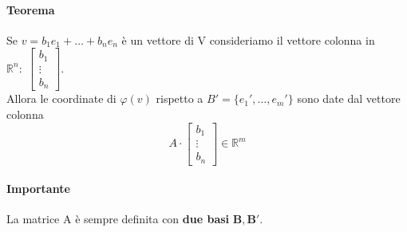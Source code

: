 \documentclass[a4paper, 12pt]{report}
\begin{document}
            \paragraph{Teorema} Se $v=b_1e_1+\dots+b_ne_n$ è un vettore di V consideriamo il vettore
            colonna in $\mathbb{R}^n: \;
            \begin{bmatrix}
                b_1\\
                \vdots\\
                b_n
            \end{bmatrix}
            $.\\
            Allora le coordinate di $\varphi(v)$ rispetto a $B'=\{e_1',\dots,e_m'\}$ sono date dal vettore colonna
            $$
            A \cdot
            \begin{bmatrix}
                b_1\\
                \vdots\\
                b_n    
            \end{bmatrix}
            \in \mathbb{R}^m
            $$
            \paragraph{Importante} La matrice A è sempre definita con \textbf{due basi} $\boldsymbol{B,B'}$.
\end{document}

